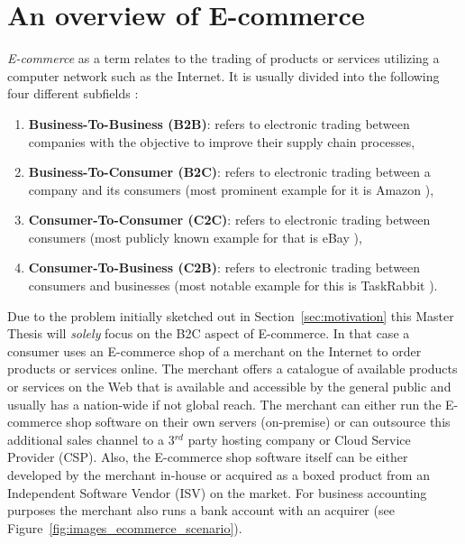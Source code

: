 
\section{An overview of \gls{E-commerce}}
\label{sec:e_commerce_scenario}

\emph{\Gls{E-commerce}} as a term relates to the trading of products or services utilizing a computer network such as the Internet. It is usually divided into the following four different subfields \citep{sen2015study}:\@

\begin{enumerate}
  \item \textbf{Business-To-Business (\gls{B2B})}: refers to electronic trading between companies with the objective to improve their supply chain processes,
  \item \textbf{Business-To-Consumer (\gls{B2C})}: refers to electronic trading between a company and its consumers (most prominent example for it is Amazon \citep{Amazon.com}),
  \item \textbf{Consumer-To-Consumer (\gls{C2C})}: refers to electronic trading between consumers (most publicly known example for that is eBay \citep{eBayInc}),
  \item \textbf{Consumer-To-Business (\gls{C2B})}: refers to electronic trading between consumers and businesses (most notable example for this is TaskRabbit \citep{TaskRabbit}).
\end{enumerate}

Due to the problem initially sketched out in Section~\ref{sec:motivation} this Master Thesis will \emph{solely} focus on the \gls{B2C} aspect of \gls{E-commerce}. In that case a consumer uses an \gls{E-commerce} shop of a merchant on the Internet to order products or services online. The merchant offers a catalogue of available products or services on the Web that is available and accessible by the general public and usually has a nation-wide if not global reach. The merchant can either run the \gls{E-commerce} shop software on their own servers (on-premise) or can outsource this additional sales channel to a 3$^{rd}$ party hosting company or Cloud Service Provider (\gls{CSP}). Also, the \gls{E-commerce} shop software itself can be either developed by the merchant in-house or acquired as a boxed product from an Independent Software Vendor (\gls{ISV}) on the market. For business accounting purposes the merchant also runs a bank account with an acquirer (see Figure~\ref{fig:images_ecommerce_scenario}). \\

